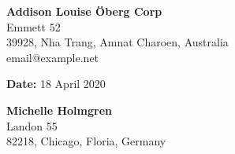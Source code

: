 \documentclass[a4paper]{letter}
\begin{document}
\RaggedRight
%
\begin{minipage}[t]{0.5\textwidth}
	\begin{flushleft}

	\end{flushleft}
\end{minipage}%
\begin{minipage}[t]{0.5\textwidth}
 	\begin{flushright}
		\textbf{\huge  Addison Louise 	 Öberg Corp} \\
		{\large Emmett 52}\\
		{\large 39928, Nha Trang, Amnat Charoen, Australia }\\
		{\large email@example.net}
	
 	\end{flushright}
\end{minipage}%

\begin{minipage}[t]{0.5\textwidth}
	\begin{flushleft}

	\end{flushleft}
\end{minipage}%
\begin{minipage}[t]{0.5\textwidth}
 	\begin{flushright}
		\textbf{\large Date:} 18 April 2020\\		
 	\end{flushright}
\end{minipage}%

\begin{minipage}[t]{0.5\textwidth}
	\begin{flushleft}
	 	\textbf{\large Michelle Holmgren } \\
		{\large Landon 55}\\
		{\large 82218, Chicago, Floria, Germany }\\
	\end{flushleft}
\end{minipage}
\begin{minipage}[t]{0.5\textwidth}
 	\begin{flushright} 	
	
 	\end{flushright}
\end{minipage}%
\end{document}
